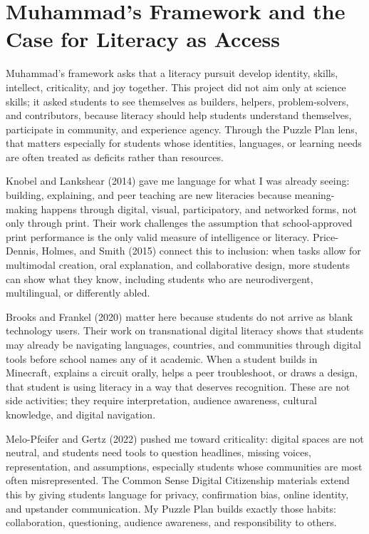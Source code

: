 \documentclass[11pt]{article}
\begin{document}
\section*{Muhammad's Framework and the Case for Literacy as Access}

Muhammad's framework asks that a literacy pursuit develop identity, skills, intellect, criticality, and joy together. This project did not aim only at science skills; it asked students to see themselves as builders, helpers, problem-solvers, and contributors, because literacy should help students understand themselves, participate in community, and experience agency. Through the Puzzle Plan lens, that matters especially for students whose identities, languages, or learning needs are often treated as deficits rather than resources.

Knobel and Lankshear (2014) gave me language for what I was already seeing: building, explaining, and peer teaching are new literacies because meaning-making happens through digital, visual, participatory, and networked forms, not only through print. Their work challenges the assumption that school-approved print performance is the only valid measure of intelligence or literacy. Price-Dennis, Holmes, and Smith (2015) connect this to inclusion: when tasks allow for multimodal creation, oral explanation, and collaborative design, more students can show what they know, including students who are neurodivergent, multilingual, or differently abled.

Brooks and Frankel (2020) matter here because students do not arrive as blank technology users. Their work on transnational digital literacy shows that students may already be navigating languages, countries, and communities through digital tools before school names any of it academic. When a student builds in Minecraft, explains a circuit orally, helps a peer troubleshoot, or draws a design, that student is using literacy in a way that deserves recognition. These are not side activities; they require interpretation, audience awareness, cultural knowledge, and digital navigation.

Melo-Pfeifer and Gertz (2022) pushed me toward criticality: digital spaces are not neutral, and students need tools to question headlines, missing voices, representation, and assumptions, especially students whose communities are most often misrepresented. The Common Sense Digital Citizenship materials extend this by giving students language for privacy, confirmation bias, online identity, and upstander communication. My Puzzle Plan builds exactly those habits: collaboration, questioning, audience awareness, and responsibility to others.
\end{document}
